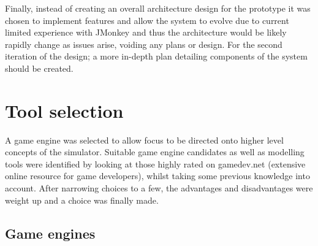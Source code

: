 \documentclass[11pt]{report}
\begin{document}
Finally, instead of creating an overall architecture design for the prototype it was chosen to implement features and allow the system to evolve due to current limited experience with JMonkey and thus the architecture would be likely rapidly change as issues arise, voiding any plans or design. For the second iteration of the design; a more in-depth plan detailing components of the system should be created.

\section{Tool selection}
A game engine was selected to allow focus to be directed onto higher level concepts of the simulator. Suitable game engine candidates as well as modelling tools were identified by looking at those highly rated on gamedev.net (extensive online resource for game developers), whilst taking some previous knowledge into account. After narrowing choices to a few, the advantages and disadvantages were weight up and a choice was finally made. 

\subsection{Game engines}
\end{document}
